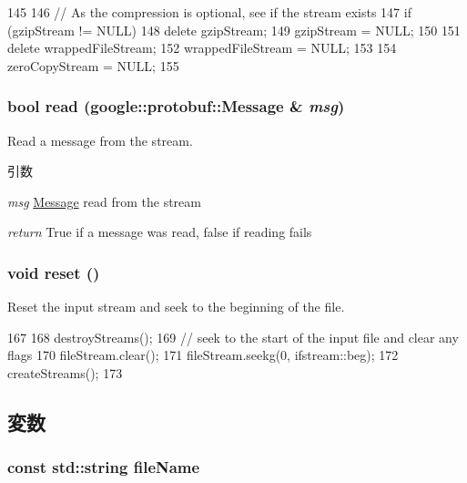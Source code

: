 \begin{DoxyCode}
145 {
146     // As the compression is optional, see if the stream exists
147     if (gzipStream != NULL) {
148         delete gzipStream;
149         gzipStream = NULL;
150     }
151     delete wrappedFileStream;
152     wrappedFileStream = NULL;
153 
154     zeroCopyStream = NULL;
155 }
\end{DoxyCode}
\hypertarget{classProtoInputStream_a4b1481de1970fef94f28772e00b4ae53}{
\subsubsection[{read}]{\setlength{\rightskip}{0pt plus 5cm}bool read (google::protobuf::Message \& {\em msg})}}
\label{classProtoInputStream_a4b1481de1970fef94f28772e00b4ae53}
Read a message from the stream.


\begin{DoxyParams}{引数}
\item[{\em msg}]\hyperlink{classMessage}{Message} read from the stream \item[{\em return}]True if a message was read, false if reading fails \end{DoxyParams}
\hypertarget{classProtoInputStream_ad20897c5c8bd47f5d4005989bead0e55}{
\subsubsection[{reset}]{\setlength{\rightskip}{0pt plus 5cm}void reset ()}}
\label{classProtoInputStream_ad20897c5c8bd47f5d4005989bead0e55}
Reset the input stream and seek to the beginning of the file. 


\begin{DoxyCode}
167 {
168     destroyStreams();
169     // seek to the start of the input file and clear any flags
170     fileStream.clear();
171     fileStream.seekg(0, ifstream::beg);
172     createStreams();
173 }
\end{DoxyCode}


\subsection{変数}
\hypertarget{classProtoInputStream_ab7777c9b2f880a5587b6602dbc331097}{
\subsubsection[{fileName}]{\setlength{\rightskip}{0pt plus 5cm}const std::string {\bf fileName}}}
\label{classProtoInputStream_ab7777c9b2f880a5587b6602dbc331097}


